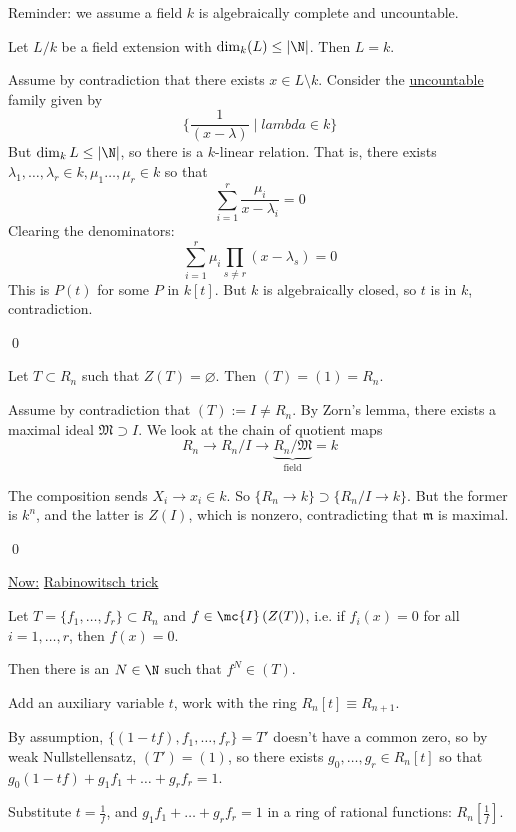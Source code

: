 \documentclass[x11names,reqno,14pt]{extarticle}
\newcommand{\mk}[1]{\mathfrak{#1}}
\begin{document}
Reminder: we assume a field $k$ is algebraically complete and uncountable.

\lem

Let $L/k$ be a field extension with $\dim_k(L) \leq |\N|$. Then $L = k$.

\proof

Assume by contradiction that there exists $x \in L\setminus k$. Consider the \underline{uncountable} family given by 
\[
\{\frac{1}{(x-\lambda)} \mid lambda \in k\}
\]
But $\dim_k L \leq |\N|$, so there is a $k$-linear relation. That is, there exists $\lambda_1,\dots,\lambda_r \in k, \mu_1\dots,\mu_r\in k$ so that
\[
\sum_{i=1}^r\frac{\mu_i}{x -\lambda_i} = 0
\]
Clearing the denominators: 
\[
\sum_{i=1}^r \mu_i\prod_{s\neq r}(x-\lambda_s) =0
\]
This is $P(t)$ for some $P$ in $k[t]$. But $k$ is algebraically closed, so $t$ is in $k$, contradiction. 

\qed


Let $T \subset R_n$ such that $Z(T) = \varnothing$. Then $(T) = (1) = R_n$.

\proof

Assume by contradiction that $(T) := I \neq R_n$. By Zorn's lemma, there exists a maximal ideal $\mk{M} \supset I$. We look at the chain of quotient maps
\[
R_n \to R_n/I \to \underbrace{R_n/\mk{M}}_{\text{field}} = k
\]

The composition sends $X_i \to x_i \in k$. So $\{R_n \to k\} \supset \{R_n/I \to k\}$. But the former is $k^n$, and the latter is $Z(I)$, which is nonzero, contradicting that $\mk{m}$ is maximal. 

\qed

\underline{Now:} \underline{Rabinowitsch trick}

\lem

Let $T = \{f_1, \dots, f_r\} \subset R_n$ and $f \in \mc{I}\left(Z(T)\right)$, i.e. if $f_i(x) = 0$ for all $i = 1,\dots,r$, then $f(x) = 0$. 

Then there is an $N \in \N$ such that $f^N \in (T)$. 

\proof

Add an auxiliary variable $t$, work with the ring $R_n[t] \equiv R_{n+1}$.

By assumption, $\{(1-tf), f_1, \dots, f_r\} = T'$ doesn't have a common zero, so by weak Nullstellensatz, $(T') = (1)$, so there exists $g_0,\dots,g_r \in R_n[t]$ so that $g_0(1-tf) + g_1f_1 + \dots + g_rf_r = 1$. 

Substitute $t = \frac{1}{f}$, and $g_1f_1 + \dots + g_rf_r = 1$ in a ring of rational functions: $R_n[\frac{1}{f}]$. 
\end{document}

